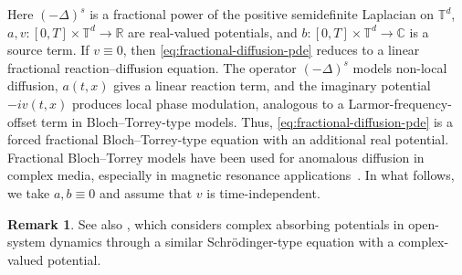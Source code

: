 \documentclass[10pt,reqno]{article}
\numberwithin{equation}{section}
\theoremstyle{plain}
\theoremstyle{definition}
\newtheorem{remark}[thm]{Remark}
\begin{document}
Here \((-\Delta)^s\) is a fractional power of the positive semidefinite Laplacian on \(\mathbb T^d\), \(a,v:[0,T]\times\mathbb T^d\to\mathbb R\) are real-valued potentials, and \(b:[0,T]\times\mathbb T^d\to\mathbb C\) is a source term. If \(v\equiv0\), then \cref{eq:fractional-diffusion-pde} reduces to a linear fractional reaction--diffusion equation. The operator \((-\Delta)^s\) models non-local diffusion, \(a(t,x)\) gives a linear reaction term, and the imaginary potential \(-iv(t,x)\) produces local phase modulation, analogous to a Larmor-frequency-offset term in Bloch--Torrey-type models. Thus, \cref{eq:fractional-diffusion-pde} is a forced fractional Bloch--Torrey-type equation with an additional real potential. Fractional Bloch--Torrey models have been used for anomalous diffusion in complex media, especially in magnetic resonance applications~\cite{Torrey1956,Magin2008,Yu2013,BuenoOrovioBurrage2017,Moutal2020}. In what follows, we take \(a,b\equiv0\) and assume that \(v\) is time-independent.

\begin{remark}
See also \cite[Equation~10]{an2023LCHS}, which considers complex absorbing potentials in open-system dynamics through a similar Schrödinger-type equation with a complex-valued potential.
\end{remark}
\end{document}

